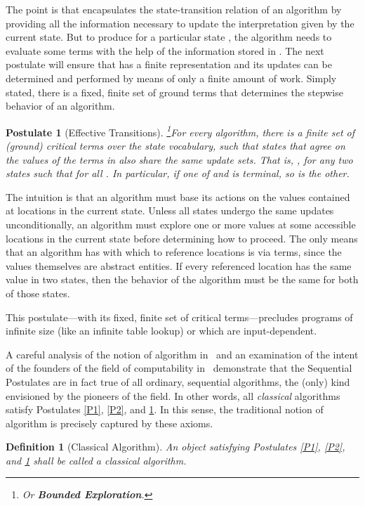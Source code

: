 \documentclass[copyright,creativecommons,english]{eptcs}
\newtheorem{postulate}{Postulate}
\newtheorem{definition}[theorem]{Definition}
\begin{document}
The point is that  encapsulates the state-transition relation  of an algorithm
by providing all the information necessary to update the interpretation given by the current state.
But to produce  for a particular state , the algorithm needs to evaluate some terms  with the help of the information stored in  .
The next postulate will ensure that  has a finite representation and its updates can be determined and performed
by means of only a finite amount of work.
Simply stated, there is a fixed, finite set of ground terms that determines the stepwise behavior of an algorithm.

\begin{postulate}[Effective Transitions]\hspace{-5pt}\footnote{Or \textbf{Bounded Exploration}.}\label{BE}
For every algorithm, there is a finite set  of (ground) \emph{critical terms}  over the state 
 vocabulary, such that
states that agree on the values of the terms in  also share the same update sets.
That is,
,
for any two states 
such that  for all .
In particular, if one of  and  is terminal, so is the other.
\end{postulate}

The intuition is that an algorithm must base its actions on the
values contained at locations in the current state.
Unless all states undergo the same updates unconditionally, an algorithm must
explore one or more values at some accessible locations in the current state before determining how to proceed.
The only means that an algorithm has with which to reference locations is via terms,
since the values themselves are abstract entities.
If every referenced location has the same value in two states,
then the behavior of the algorithm must be the same for both of those states.

This postulate---with its fixed, finite set of critical terms---precludes programs of infinite size (like an infinite table lookup) or which 
are input-dependent.

A careful analysis of the notion of algorithm in~\cite{Gurevich00}
and an examination of the intent of the founders of the field of computability in~\cite{CT}
demonstrate that the Sequential Postulates are in fact
true of all ordinary, sequential algorithms, the (only) kind envisioned
by the pioneers of the field.
In other words, all \textit{classical} algorithms satisfy Postulates \ref{P1}, \ref{P2}, and \ref{BE}.
In this sense, the traditional notion of algorithm is precisely captured by these axioms.

\begin{definition}[Classical Algorithm]\label{def:class}
An object satisfying Postulates \ref{P1}, \ref{P2}, and \ref{BE} shall be called a \emph{classical algorithm}.
\end{definition}
\end{document}
